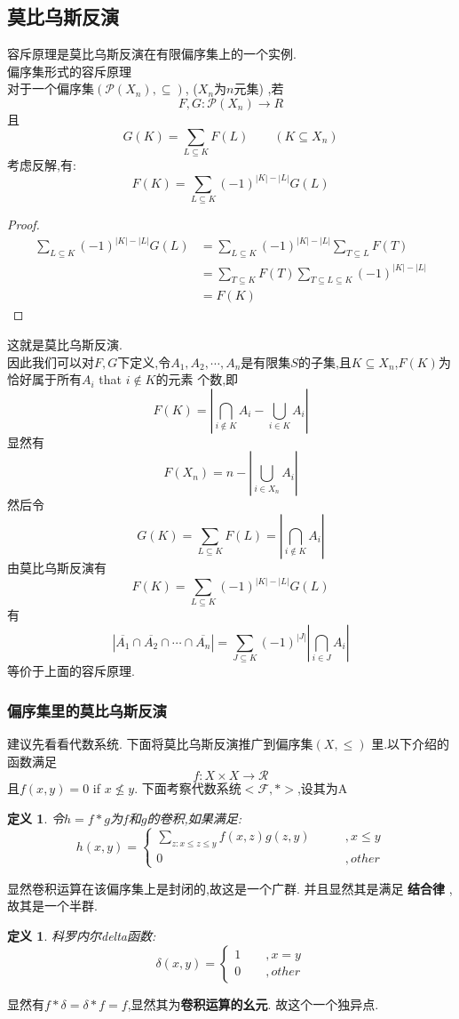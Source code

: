 \documentclass[12pt, a4paper, oneside]{ctexbook}
\newtheorem{definition}[theorem]{定义}
\begin{document}
\subsection{莫比乌斯反演}
容斥原理是莫比乌斯反演在有限偏序集上的一个实例.\\
偏序集形式的容斥原理\\
对于一个偏序集$ (\mathcal{P}(X_n),\subseteq) $, ($X_n$为$n$元集) ,若
$$
F,G:\mathcal{P}(X_n)\rightarrow R
$$
且
$$
G(K)=\sum_{L\subseteq K} F(L)\qquad (K\subseteq X_n)
$$
考虑反解,有:
$$
F(K)=\sum_{L\subseteq K} (-1)^{|K|-|L|}G(L)
$$
\begin{proof}
$$
\begin{aligned}
\sum_{L\subseteq K} (-1)^{|K|-|L|} G(L)&= \sum_{L\subseteq K} (-1)^{|K|-|L|} \sum_{T\subseteq L} F(T)\\
&= \sum_{T\subseteq K} F(T) \sum_{T\subseteq L\subseteq K} (-1)^{|K|-|L|}\\
&=F(K)
\end{aligned}
$$
\end{proof}
这就是莫比乌斯反演.\\
因此我们可以对$F,G$下定义,令$A_1,A_2,\cdots,A_n$是有限集$S$的子集,且$K\subseteq X_n$,$F(K)$为恰好属于所有$A_i$ that $i\notin K$的元素
个数,即
$$
F(K)=\left| \bigcap_{i\notin K} A_i -\bigcup_{i \in K} A_i \right|
$$
显然有
$$
F(X_n)=n-\left| \bigcup_{i \in X_n} A_i  \right|
$$
然后令
$$
G(K) =\sum_{L\subseteq K} F(L)=\left| \bigcap_{i \notin K} A_i \right|
$$
由莫比乌斯反演有
$$
F(K)=\sum_{L\subseteq K} (-1)^{|K|-|L|}G(L)
$$
有
$$
|\overline{A_1}\cap \overline{A_2} \cap \cdots \cap \overline{A_n}|=\sum_{J\subseteq K} (-1)^{|J|} \left|\bigcap_{i\in J}A_i \right|
$$
等价于上面的容斥原理.

\subsubsection{偏序集里的莫比乌斯反演}
建议先看看代数系统.
下面将莫比乌斯反演推广到偏序集$(X,\le)$ 里.以下介绍的函数满足
$$
f:X \times X \rightarrow \mathcal{R}
$$
且$f(x,y)=0$ if $x\nleq y$.
下面考察代数系统$<\mathcal{F},*>$,设其为A
\begin{definition}
令$h=f*g$为$f$和$g$的卷积,如果满足:
$$
h(x,y)=\begin{cases} \sum_{z:x\leq z\leq y} f(x,z)g(z,y) \qquad&,x\leq y\\ 0\qquad &,other\end{cases}
$$
\end{definition}
显然卷积运算在该偏序集上是封闭的,故这是一个广群.
并且显然其是满足 \textbf{结合律} ,故其是一个半群.
\begin{definition}
科罗内尔delta函数:
$$
\delta(x,y)=\begin{cases}1\qquad ,x=y\\ 0\qquad,other\end{cases}
$$
\end{definition}
显然有$f*\delta=\delta*f=f$,显然其为\textbf{卷积运算的幺元}.
故这个一个独异点.
\end{document}

